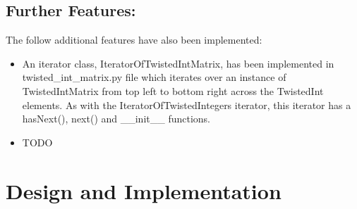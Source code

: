 \documentclass[11]{article}
\begin{document}
	\subsection{Further Features:}
		The follow additional features have also been implemented:
		\begin{itemize}
			\item An iterator class, IteratorOfTwistedIntMatrix, has been implemented in twisted\_int\_matrix.py file which iterates over an instance of TwistedIntMatrix from top left to bottom right across the TwistedInt elements. As with the IteratorOfTwistedIntegers iterator, this iterator has a hasNext(), next() and \_\_init\_\_ functions.
			\item TODO
		\end{itemize}

	\section{Design and Implementation}
\end{document}

